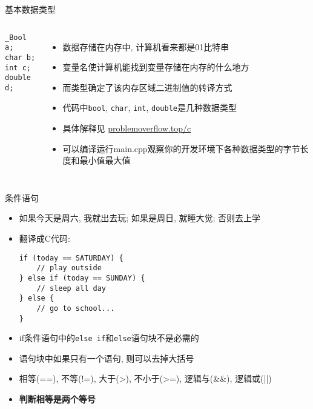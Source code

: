 \begin{frame}[fragile]{基本数据类型}
\begin{columns}[T,onlytextwidth]
\begin{verbatim}
_Bool a;
char b;
int c;
double d;
\end{verbatim}

\begin{itemize}[<+- | alert@+>]
\item 数据存储在内存中, 计算机看来都是01比特串
\item 变量名使计算机能找到变量存储在内存的什么地方
\item 而类型确定了该内存区域二进制值的转译方式
\item 代码中\texttt{bool}, \texttt{char}, \texttt{int}, \texttt{double}是几种数据类型
\item 具体解释见 \href{http://problemoverflow.top/c/1.C%E8%AF%AD%E8%A8%80%E5%85%A5%E9%97%A8/1.1.%E5%8F%98%E9%87%8F%E5%92%8C%E7%B1%BB%E5%9E%8B.html}{problemoverflow.top/c}
\item 可以编译运行main.cpp观察你的开发环境下各种数据类型的字节长度和最小值最大值
\end{itemize}
\end{columns}
\end{frame}

\begin{frame}[fragile]{条件语句}
\begin{itemize}[<+- | alert@+>]
\item 如果今天是周六, 我就出去玩; 如果是周日, 就睡大觉; 否则去上学 
\item 翻译成C代码:
\begin{verbatim}
if (today == SATURDAY) {
    // play outside
} else if (today == SUNDAY) {
    // sleep all day
} else {
    // go to school...
}
\end{verbatim}
\item if条件语句中的\texttt{else if}和\texttt{else}语句块不是必需的
\item 语句块中如果只有一个语句, 则可以去掉大括号
\item 相等(==), 不等(!=), 大于(>), 不小于(>=), 逻辑与(\&\&), 逻辑或(||)
\item \textbf{判断相等是两个等号}
\end{itemize}
\end{frame}

